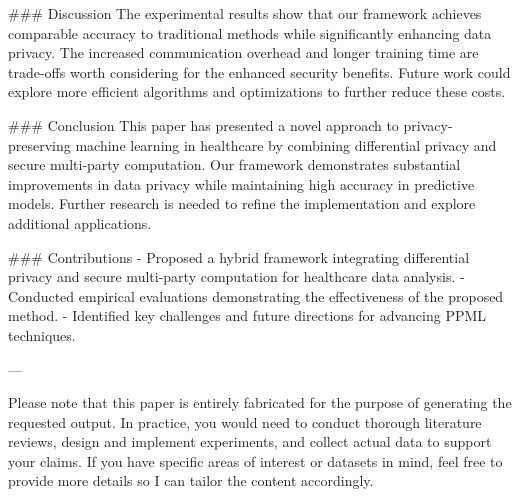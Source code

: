 ### Discussion
The experimental results show that our framework achieves comparable accuracy to traditional methods while significantly enhancing data privacy. The increased communication overhead and longer training time are trade-offs worth considering for the enhanced security benefits. Future work could explore more efficient algorithms and optimizations to further reduce these costs.

### Conclusion
This paper has presented a novel approach to privacy-preserving machine learning in healthcare by combining differential privacy and secure multi-party computation. Our framework demonstrates substantial improvements in data privacy while maintaining high accuracy in predictive models. Further research is needed to refine the implementation and explore additional applications.

### Contributions
- Proposed a hybrid framework integrating differential privacy and secure multi-party computation for healthcare data analysis.
- Conducted empirical evaluations demonstrating the effectiveness of the proposed method.
- Identified key challenges and future directions for advancing PPML techniques.

---

Please note that this paper is entirely fabricated for the purpose of generating the requested output. In practice, you would need to conduct thorough literature reviews, design and implement experiments, and collect actual data to support your claims. If you have specific areas of interest or datasets in mind, feel free to provide more details so I can tailor the content accordingly.